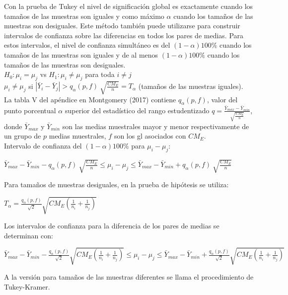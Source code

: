 Con la prueba de Tukey el nivel de significación global es exactamente  cuando los tamaños de las muestras son iguales y como máximo $\alpha$ cuando los tamaños de las muestras son desiguales. Este método también puede utilizarse para construir intervalos de confianza sobre las diferencias en todos los pares de medias. Para estos intervalos, el nivel de confianza simultáneo es del $(1-\alpha)100\%$ cuando los tamaños de las muestras son iguales y de al menos $(1-\alpha)100\%$  cuando los tamaños de las muestras son desiguales.\\

$H_{0}:\mu_{i} = \mu_{j}$ vs $H_{1}:\mu_{i} \neq \mu_{j}$ para toda $i \neq j$\\

 $\mu_{i} \neq \mu_{j}$ si $| \bar{Y}_{i} -\bar{Y}_{j} | > q_{\alpha} (p,f) \: \sqrt{\frac{CM_{E}}{n}} = T_{\alpha}$ (tamaños de las muestras iguales).\\
 

La tabla V del apéndice en Montgomery (2017) contiene $q_{\alpha} (p,f)$, valor del punto porcentual $\alpha$ superior del estadístico del rango estudentizado $q=\frac{ \bar{Y}_{max} -\bar{Y}_{min}}{ \sqrt{\frac{CM_{E}}{n}}}$, donde $\bar{Y}_{max}$ y $\bar{Y}_{min}$ son las medias muestrales mayor y menor respectivamente de un grupo de $p$ medias muestrales, $f$ son los gl asociados con $CM_{E}$.\\
 
Intervalo de confianza del  $(1-\alpha)100\%$ para $\mu_{i} - \mu_{j}$:\\
 
\begin{center}
	$ \bar{Y}_{max} -\bar{Y}_{min} -  q_{\alpha} (p,f) \: \sqrt{\frac{CM_{E}}{n}} \leq \mu_{i} - \mu_{j} \leq \bar{Y}_{max} -\bar{Y}_{min} + q_{\alpha} (p,f) \: \sqrt{\frac{CM_{E}}{n}} $ \\
\end{center}

Para tamaños de muestras desiguales, en la prueba de hipótesis se utiliza:\\

\begin{center}
	$ T_{\alpha} = \frac{q_{\alpha} (p,f)}{\sqrt{2}} \sqrt{CM_{E} (\frac{1}{n_{i}} + \frac{1}{n_{j}})}  $ \\
\end{center}


Los intervalos de confianza para la diferencia de los pares de medias se determinan con:\\


\begin{center}
	$ \bar{Y}_{max} -\bar{Y}_{min} -  \frac{q_{\alpha} (p,f)}{\sqrt{2}} \sqrt{CM_{E} (\frac{1}{n_{i}} + \frac{1}{n_{j}})}  \leq \mu_{i} - \mu_{j} \leq \bar{Y}_{max} -\bar{Y}_{min} + \frac{q_{\alpha} (p,f)}{\sqrt{2}} \sqrt{CM_{E} (\frac{1}{n_{i}} + \frac{1}{n_{j}})}  $ \\
\end{center}

A la versión para tamaños de las muestras diferentes se llama el procedimiento de Tukey-Kramer.
